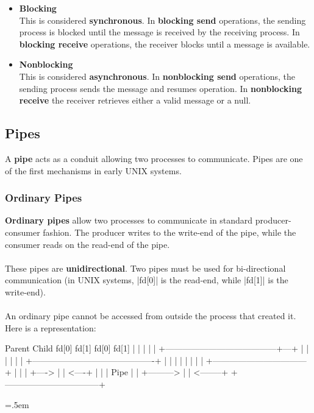 \documentclass{article}
\newenvironment{cverbatim}
 {\SaveVerbatim{cverb}}
 {\endSaveVerbatim
  \flushleft\fboxrule=0pt\fboxsep=.5em
  \colorbox{cverbbg}{\BUseVerbatim{cverb}}%
  \endflushleft
}
\begin{document}
\begin{itemize}
	\item \textbf{Blocking}
	\vspace{.2cm} \\
	This is considered \textbf{synchronous}. In \textbf{blocking send} operations, the sending process is blocked until the message is received by the receiving process. In \textbf{blocking receive} operations, the receiver blocks until a message is available.
	
	\item \textbf{Nonblocking}\
	\vspace{.2cm} \\
	This is considered \textbf{asynchronous}. In \textbf{nonblocking send} operations, the sending process sends the message and resumes operation. In \textbf{nonblocking receive} the receiver retrieves either a valid message or a null.
\end{itemize}

\subsection{Pipes}
A \textbf{pipe} acts as a conduit allowing two processes to communicate. Pipes are one of the first mechanisms in early UNIX systems.

\subsubsection{Ordinary Pipes}
\textbf{Ordinary pipes} allow two processes to communicate in standard producer-consumer fashion. The producer writes to the write-end of the pipe, while the consumer reads on the read-end of the pipe. \\ \\
These pipes are \textbf{unidirectional}. Two pipes must be used for bi-directional communication (in UNIX systems, \cverb|fd[0]| is the read-end, while \cverb|fd[1]| is the write-end). \\ \\
An ordinary pipe cannot be accessed from outside the process that created it. Here is a representation:

\begin{cverbatim}
      Parent                                           Child
  fd[0]    fd[1]                                   fd[0]   fd[1]
   |        |                                       |       |
   |        +---------------------------------------+---+   |
   |                                                |   |   |
   |    +-------------------------------------------+   |   |
   |    |                                               |   |
   |    |      +---------------------------------+      |   |
   |    +----> |                                 | <----+   |
   |           |              Pipe               |          |
   +---------> |                                 | <--------+
               +---------------------------------+
                
\end{cverbatim}
\end{document}
